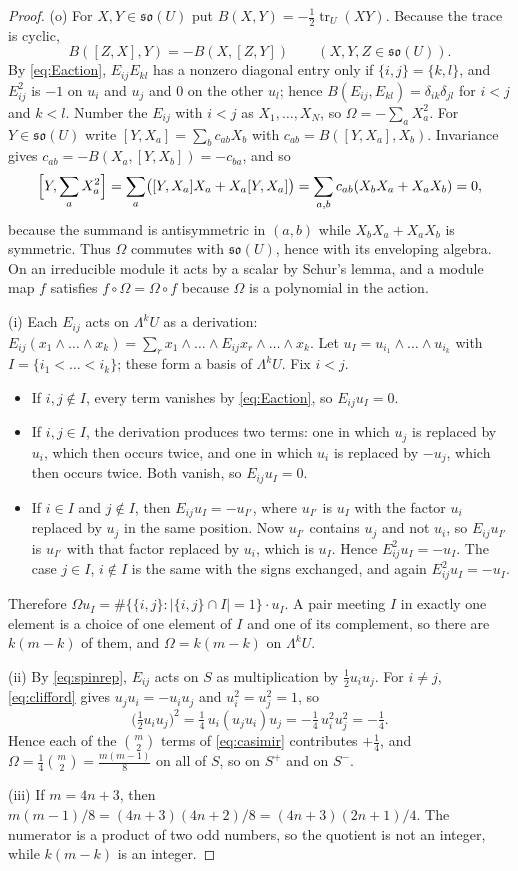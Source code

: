 \documentclass[11pt]{amsart}
\theoremstyle{remark}
\newcommand{\so}{\mathfrak{so}}
\begin{document}
\begin{proof}
(o) For $X,Y\in\so(U)$ put $B(X,Y)=-\tfrac12\operatorname{tr}_U(XY)$. Because the trace is cyclic,
\[
B([Z,X],Y)=-B(X,[Z,Y])\qquad(X,Y,Z\in\so(U)).
\]
 By \eqref{eq:Eaction}, $E_{ij}E_{kl}$ has a nonzero diagonal entry only if $\{i,j\}=\{k,l\}$, and $E_{ij}^2$ is $-1$ on $u_i$ and $u_j$ and $0$ on the other $u_l$; hence $B(E_{ij},E_{kl})=\delta_{ik}\delta_{jl}$ for $i<j$ and $k<l$. Number the $E_{ij}$ with $i<j$ as $X_1,\dots,X_N$, so $\Omega=-\sum_aX_a^2$. For $Y\in\so(U)$ write $[Y,X_a]=\sum_bc_{ab}X_b$ with $c_{ab}=B([Y,X_a],X_b)$. Invariance gives $c_{ab}=-B(X_a,[Y,X_b])=-c_{ba}$, and so
\[
\Bigl[Y,\sum_aX_a^2\Bigr]=\sum_a\bigl([Y,X_a]X_a+X_a[Y,X_a]\bigr)=\sum_{a,b}c_{ab}(X_bX_a+X_aX_b)=0,
\]
because the summand is antisymmetric in $(a,b)$ while $X_bX_a+X_aX_b$ is symmetric. Thus $\Omega$ commutes with $\so(U)$, hence with its enveloping algebra. On an irreducible module it acts by a scalar by Schur's lemma, and a module map $f$ satisfies $f\circ\Omega=\Omega\circ f$ because $\Omega$ is a polynomial in the action.

(i) Each $E_{ij}$ acts on $\Lambda^kU$ as a derivation: $E_{ij}(x_1\wedge\dots\wedge x_k)=\sum_rx_1\wedge\dots\wedge E_{ij}x_r\wedge\dots\wedge x_k$. Let $u_I=u_{i_1}\wedge\dots\wedge u_{i_k}$ with $I=\{i_1<\dots<i_k\}$; these form a basis of $\Lambda^kU$. Fix $i<j$.
\begin{itemize}
\item If $i,j\notin I$, every term vanishes by \eqref{eq:Eaction}, so $E_{ij}u_I=0$.
\item If $i,j\in I$, the derivation produces two terms: one in which $u_j$ is replaced by $u_i$, which then occurs twice, and one in which $u_i$ is replaced by $-u_j$, which then occurs twice. Both vanish, so $E_{ij}u_I=0$.
\item If $i\in I$ and $j\notin I$, then $E_{ij}u_I=-u_{I'}$, where $u_{I'}$ is $u_I$ with the factor $u_i$ replaced by $u_j$ in the same position. Now $u_{I'}$ contains $u_j$ and not $u_i$, so $E_{ij}u_{I'}$ is $u_{I'}$ with that factor replaced by $u_i$, which is $u_I$. Hence $E_{ij}^2u_I=-u_I$. The case $j\in I$, $i\notin I$ is the same with the signs exchanged, and again $E_{ij}^2u_I=-u_I$.
\end{itemize}
Therefore $\Omega u_I=\#\{\{i,j\}:|\{i,j\}\cap I|=1\}\cdot u_I$. A pair meeting $I$ in exactly one element is a choice of one element of $I$ and one of its complement, so there are $k(m-k)$ of them, and $\Omega=k(m-k)$ on $\Lambda^kU$.

(ii) By \eqref{eq:spinrep}, $E_{ij}$ acts on $S$ as multiplication by $\tfrac12u_iu_j$. For $i\ne j$, \eqref{eq:clifford} gives $u_ju_i=-u_iu_j$ and $u_i^2=u_j^2=1$, so
\[
\bigl(\tfrac12u_iu_j\bigr)^2=\tfrac14\,u_i(u_ju_i)u_j=-\tfrac14\,u_i^2u_j^2=-\tfrac14 .
\]
Hence each of the $\binom m2$ terms of \eqref{eq:casimir} contributes $+\tfrac14$, and $\Omega=\tfrac14\binom m2=\tfrac{m(m-1)}8$ on all of $S$, so on $S^+$ and on $S^-$.

(iii) If $m=4n+3$, then $m(m-1)/8=(4n+3)(4n+2)/8=(4n+3)(2n+1)/4$. The numerator is a product of two odd numbers, so the quotient is not an integer, while $k(m-k)$ is an integer.
\end{proof}
\end{document}
